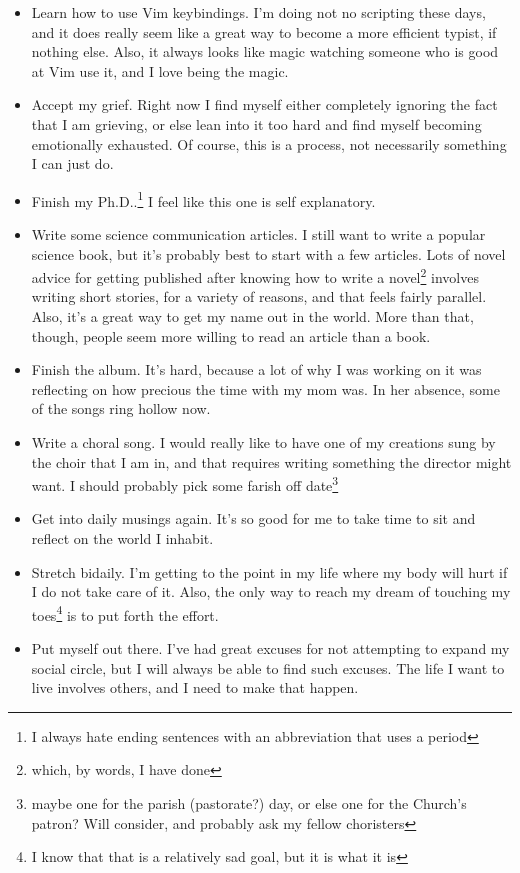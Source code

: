 \documentclass[12pt]{article}[titlepage]
\renewcommand{\,}{\textsuperscript{,}}
\begin{document}
\begin{itemize}  
\item Learn how to use Vim keybindings. I'm doing not no scripting these days, and it does really seem like a great way to become a more efficient typist, if nothing else. Also, it always looks like magic watching someone who is good at Vim use it, and I love being the magic.  
\item Accept my grief. Right now I find myself either completely ignoring the fact that I am grieving, or else lean into it too hard and find myself becoming emotionally exhausted. Of course, this is a process, not necessarily something I can just do.  
\item Finish my Ph.D..\footnote{I always hate ending sentences with an abbreviation that uses a period} I feel like this one is self explanatory.  
\item Write some science communication articles. I still want to write a popular science book, but it's probably best to start with a few articles. Lots of novel advice for getting published after knowing how to write a novel\footnote{which, by words, I have done} involves writing short stories, for a variety of reasons, and that feels fairly parallel. Also, it's a great way to get my name out in the world. More than that, though, people seem more willing to read an article than a book.  
\item Finish the album. It's hard, because a lot of why I was working on it was reflecting on how precious the time with my mom was. In her absence, some of the songs ring hollow now.  
\item Write a choral song. I would really like to have one of my creations sung by the choir that I am in, and that requires writing something the director might want. I should probably pick some far\-ish off date\footnote{maybe one for the parish (pastorate?) day, or else one for the Church's patron? Will consider, and probably ask my fellow choristers}  
\item Get into daily musings again. It's so good for me to take time to sit and reflect on the world I inhabit.  
\item Stretch bidaily. I'm getting to the point in my life where my body will hurt if I do not take care of it. Also, the only way to reach my dream of touching my toes\footnote{I know that that is a relatively sad goal, but it is what it is} is to put forth the effort.  
\item Put myself out there. I've had great excuses for not attempting to expand my social circle, but I will always be able to find such excuses. The life I want to live involves others, and I need to make that happen.  

\end{itemize}
\end{document}
